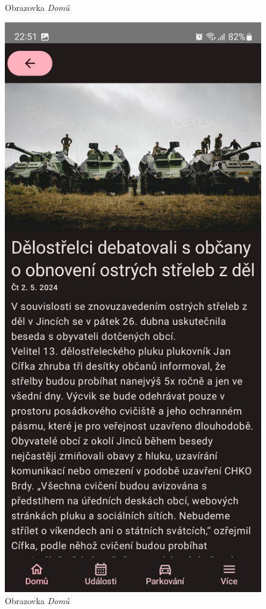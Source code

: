 \begin{figure}[H]
    \caption{Obrazovka \textit{Domů}}
  \endminipage\hfill
    \includegraphics[width=\linewidth]{screens/1b_B.jpg}
    \caption{Obrazovka \textit{Domů}}
  \endminipage\hfill
\end{figure}

